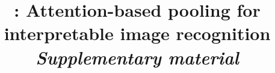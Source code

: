 \documentclass[10pt,twocolumn,letterpaper]{article}
\begin{document}











\clearpage
{\small


}


\clearpage
\title{\Ours: Attention-based pooling for interpretable image recognition \\ \emph{Supplementary material}}

\maketitle

\appendix
\setcounter{page}{1}

\renewcommand{\thesection}{A\arabic{section}}
\renewcommand{\theequation}{A\arabic{equation}}
\renewcommand{\thetable}{A\arabic{table}}
\renewcommand{\thefigure}{A\arabic{figure}}

\end{document}
